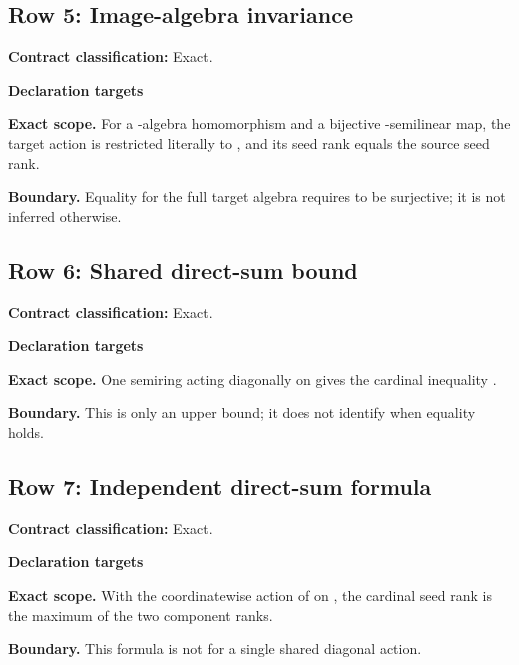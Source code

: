 \subsection{Row 5: Image-algebra invariance}
\label{row:5}
\textbf{Contract classification:} Exact.
\par\smallskip\textbf{Declaration targets}\par
{\small\noindent{}\par}
\medskip\noindent\textbf{Exact scope.} For a -algebra homomorphism  and a bijective -semilinear map, the target action is restricted literally to , and its seed rank equals the source seed rank.
\par\smallskip\noindent\textbf{Boundary.} Equality for the full target algebra  requires  to be surjective; it is not inferred otherwise.
\medskip
\subsection{Row 6: Shared direct-sum bound}
\label{row:6}
\textbf{Contract classification:} Exact.
\par\smallskip\textbf{Declaration targets}\par
{\small\noindent{}\par}
\medskip\noindent\textbf{Exact scope.} One semiring acting diagonally on  gives the cardinal inequality .
\par\smallskip\noindent\textbf{Boundary.} This is only an upper bound; it does not identify when equality holds.
\medskip
\subsection{Row 7: Independent direct-sum formula}
\label{row:7}
\textbf{Contract classification:} Exact.
\par\smallskip\textbf{Declaration targets}\par
{\small\noindent{}\par}
\medskip\noindent\textbf{Exact scope.} With the coordinatewise action of  on , the cardinal seed rank is the maximum of the two component ranks.
\par\smallskip\noindent\textbf{Boundary.} This formula is not for a single shared diagonal action.
\medskip
